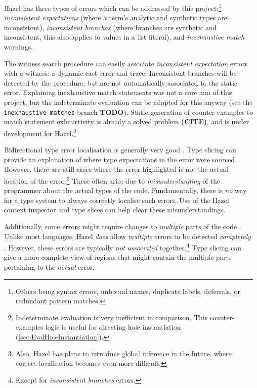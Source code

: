 Hazel has three types of errors which can be addressed by this project:\footnote{Others being syntax errors, unbound names, duplicate labels, deferrals, or redundant pattern matches.} \textit{inconsistent expectations} (where a term's analytic and synthetic types are inconsistent), \textit{inconsistent branches }(where branches are synthetic and inconsistent, this also applies to values in a list literal), and \textit{inexhaustive match} warnings. 

The witness search procedure can easily associate \textit{inconsistent expectation} errors with a witness: a dynamic cast error and trace. Inconsistent branches will be detected by the procedure, but are not automatically associated to the static error. Explaining inexhaustive match statements was not a core aim of this project, but the indeterminate evaluation can be adapted for this anyway (see the \texttt{inexhaustive-matches} branch \textbf{TODO}). Static generation of counter-examples to match statement exhaustivity is already a solved problem \textbf{(CITE)}, and is under development for Hazel.\footnote{Indeterminate evaluation is very inefficient in comparison. This counter-examples logic is useful for directing hole instantiation (\cref{sec:EvalHoleInstantiation}).}

Bidirectional type error localisation is generally very good \cite{BidirectionalTyping}. Type slicing can provide an explanation of where type expectations in the error were sourced. However, there are still cases where the error highlighted is not the actual location of the error.\footnote{Also, Hazel has plans to introduce global inference in the future, where correct localisation becomes even more difficult.} These often arise due to \textit{misunderstanding} of the programmer about the actual types of the code. Fundamentally, there is \textit{no} way for a type system to always correctly localise such errors. Use of the Hazel context inspector and type slices can help clear these misunderstandings.

Additionally, some errors might require changes to \textit{multiple} parts of the code \cite{StudentTypeErrorFixes}. Unlike most languages, Hazel \textit{does} allow \textit{multiple} errors to be detected \textit{completely} \cite{HazelErrors}. However, these errors are typically \textit{not associated} together.\footnote{Except for \textit{inconsistent branches} errors.} Type slicing can give a more complete view of regions that might contain the multiple parts pertaining to the \textit{actual} error.

